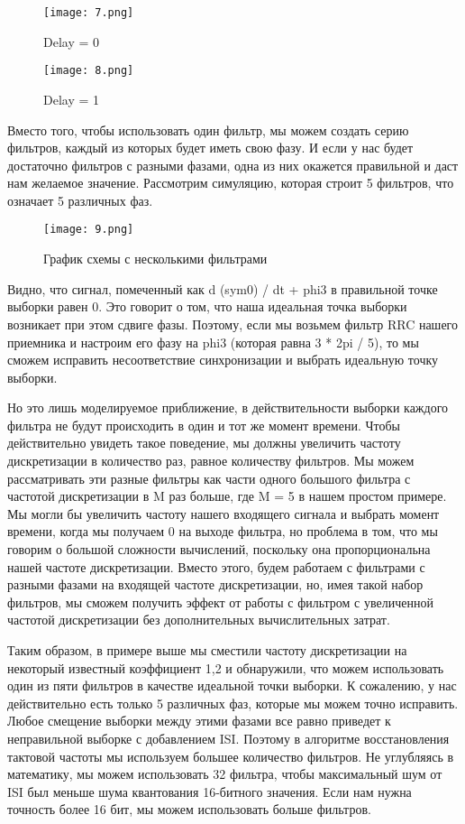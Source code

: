 \documentclass[a4paper,12pt]{report}
\begin{document}
\begin{figure}[H]
        \centering
        \texttt{[image: 7.png]}
        \caption{Delay = 0}
        \label{fig:ig4_1}
\end{figure}

\begin{figure}[H]
        \centering
        \texttt{[image: 8.png]}
        \caption{Delay = 1}
        \label{fig:ig4_1}
\end{figure}

Вместо того, чтобы использовать один фильтр, мы можем создать серию фильтров, каждый из которых будет иметь свою фазу. И если у нас будет достаточно фильтров с разными фазами, одна из них окажется правильной и даст нам желаемое значение. Рассмотрим симуляцию, которая строит 5 фильтров, что означает 5 различных фаз.

\begin{figure}[H]
        \centering
        \texttt{[image: 9.png]}
        \caption{График схемы с несколькими фильтрами}
        \label{fig:ig4_1}
\end{figure}

Видно, что сигнал, помеченный как d (sym0) / dt + phi3 в правильной точке выборки равен 0. Это говорит о том, что наша идеальная точка выборки возникает при этом сдвиге фазы. Поэтому, если мы возьмем фильтр RRC нашего приемника и настроим его фазу на phi3 (которая равна 3 * 2pi / 5), то мы сможем исправить несоответствие синхронизации и выбрать идеальную точку выборки. 

Но это лишь моделируемое приближение, в действительности выборки каждого фильтра не будут происходить в один и тот же момент времени. Чтобы действительно увидеть такое поведение, мы должны увеличить частоту дискретизации в количество раз, равное количеству фильтров. Мы можем рассматривать эти разные фильтры как части одного большого фильтра с частотой дискретизации в M раз больше, где M = 5 в нашем простом примере. Мы могли бы увеличить частоту нашего входящего сигнала и выбрать момент времени, когда мы получаем 0 на выходе фильтра, но проблема в том, что мы говорим о большой сложности вычислений, поскольку она пропорциональна нашей частоте дискретизации. Вместо этого, будем работаем с фильтрами с разными фазами на входящей частоте дискретизации, но, имея такой набор фильтров, мы сможем получить эффект от работы с фильтром с увеличенной частотой дискретизации без дополнительных вычислительных затрат. 

Таким образом, в примере выше мы сместили частоту дискретизации на некоторый известный коэффициент 1,2 и обнаружили, что можем использовать один из пяти фильтров в качестве идеальной точки выборки. К сожалению, у нас действительно есть только 5 различных фаз, которые мы можем точно исправить. Любое смещение выборки между этими фазами все равно приведет к неправильной выборке с добавлением ISI. Поэтому в алгоритме восстановления тактовой частоты мы используем большее количество фильтров. Не углубляясь в математику, мы можем использовать 32 фильтра, чтобы максимальный шум от ISI был меньше шума квантования 16-битного значения. Если нам нужна точность более 16 бит, мы можем использовать больше фильтров. 
\end{document}
